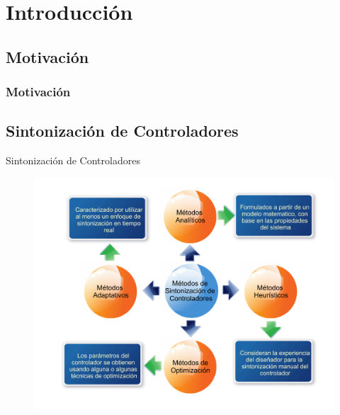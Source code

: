 \section{Introducción}
\subsection{Motivación}
\begin{frame}
	\frametitle{Motivación}
	\begin{block}{}
		
	\end{block}
\end{frame}

\subsection{Sintonización de Controladores}
\begin{frame}[shrink=20]{Sintonización de Controladores}
	\begin{figure}
		\begin{center}
			\includegraphics[scale=1]{Introduccion/MetSintCtrl.pdf}  
		\end{center}
	\end{figure}

\end{frame}

